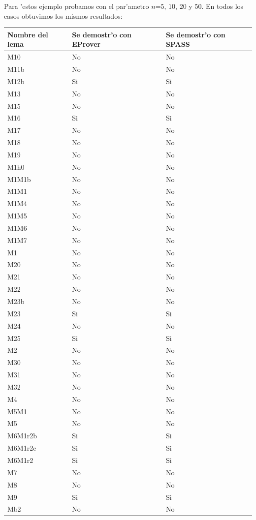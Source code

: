 Para 'estos ejemplo probamos con el par'ametro $n$=$5$, $10$, $20$ y $50$. En todos los casos obtuvimos los mismos resultados:

\vspace{1em}

\begin{tabular}{| l | l | l |}
\hline
  Nombre del lema & Se demostr'o con EProver & Se demostr'o con SPASS  \\\hline
  
M10 & No & No \\
M11b & No & No \\
M12b & Si & Si \\
M13 & No & No \\
M15 & No & No \\
M16 & Si & Si \\
M17 & No & No \\
M18 & No & No \\
M19 & No & No \\
M1h0 & No & No \\
M1M1b & No & No \\
M1M1 & No & No \\
M1M4 & No & No \\
M1M5 & No & No \\
M1M6 & No & No \\
M1M7 & No & No \\
M1 & No & No \\
M20 & No & No \\
M21 & No & No \\
M22 & No & No \\
M23b & No & No \\
M23 & Si & Si \\
M24 & No & No \\
M25 & Si & Si \\
M2 & No & No \\
M30 & No & No \\
M31 & No & No \\
M32 & No & No \\
M4 & No & No \\
M5M1 & No & No \\
M5 & No & No \\
M6M1r2b & Si & Si \\
M6M1r2c & Si & Si \\
M6M1r2 & Si & Si \\
M7 & No & No \\
M8 & No & No \\
M9 & Si & Si \\
Mb2 & No & No \\

\hline
\end{tabular}


